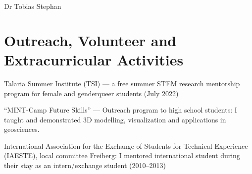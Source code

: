 \documentclass[10pt, paper=letter]{scrartcl} %
\begin{document}
\begin{cv}{\textsf{Dr Tobias Stephan}}
    \section{Outreach, Volunteer and Extracurricular Activities}
    \begin{cvlist}{}
        \item Talaria Summer Institute (TSI) --- a free summer STEM research mentorship
        program for female and genderqueer students (July 2022)
        \item  \enquote{MINT-Camp Future Skills} --- Outreach program to high school students: I taught and demonstrated 3D modelling, visualization and applications in geosciences.
        \item International Association for the Exchange of Students for Technical Experience
        (IAESTE), local committee Freiberg: I mentored international student during
        their stay as an intern/exchange student (2010--2013)
    \end{cvlist}



\end{cv}
\end{document}
